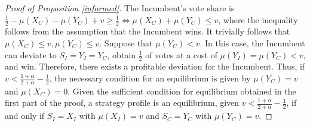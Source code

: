 \documentclass[12pt,english]{article}
\begin{document}
\begin{proof}[Proof of Proposition \ref{informed}]
The Incumbent's vote share is $\frac{1}{2} - \mu(X_C)  - \mu(Y_C)  + v \geq \frac{1}{2} \Leftrightarrow \mu(X_C) + \mu(Y_C) \leq v$, where the inequality follows from the assumption that the Incumbent wins. It trivially follows that $\mu(X_C)\leq v,\mu(Y_C) \leq v$. 
Suppose that $\mu(Y_C) < v$. In this case, the Incumbent can deviate to $S_I = Y_I = Y_C$, obtain $\frac{1}{2}$ of votes at a cost of $\mu(Y_I) = \mu(Y_C) < v$, and win. Therefore, there exists a profitable deviation for the Incumbent. 
Thus, if $v < \frac{1 + \alpha}{2 + \alpha} - \frac{1}{2}$, the necessary condition for an equilibrium is given by $\mu(Y_C) = v$ and $\mu(X_C) = 0$. Given the sufficient condition for equilibrium obtained in the first part of the proof, a strategy profile is an equilibrium, given $v < \frac{1 + \alpha}{2 + \alpha} - \frac{1}{2}$, if and only if $S_I = X_I$ with $\mu(X_I) = v$ and $S_C = Y_C$ with $\mu(Y_C) = v$. 
\end{proof}


\end{document}
